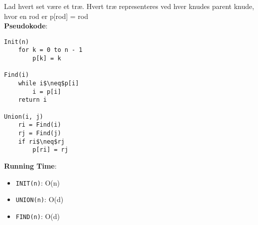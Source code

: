 Lad hvert set være et træ. Hvert træ representeres ved hver knudes parent knude, hvor en rod er p[rod] = rod\\
\textbf{Pseudokode}:
\begin{lstlisting}[frame=single, mathescape=true]
Init(n)
	for k = 0 to n - 1
		p[k] = k

Find(i)
	while i$\neq$p[i]
		i = p[i]
	return i

Union(i, j)
	ri = Find(i)
	rj = Find(j)
	if ri$\neq$rj
		p[ri] = rj
\end{lstlisting}
\textbf{Running Time}:
\begin{itemize}
	\item \texttt{INIT(n)}: O(n)
	\item \texttt{UNION(n)}: O(d)
	\item \texttt{FIND(n)}: O(d)
\end{itemize}